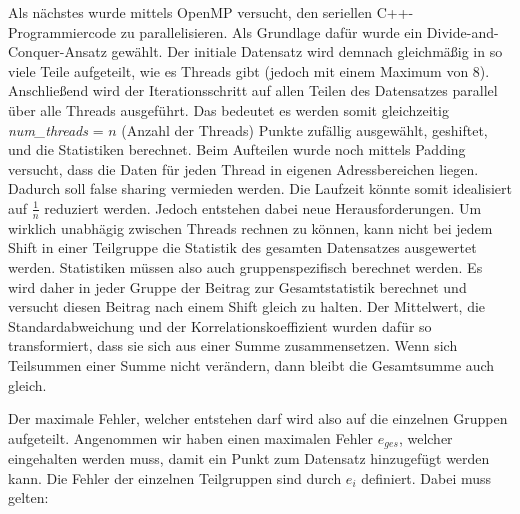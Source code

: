 \documentclass[sigconf]{acmart}
\begin{document}

Als nächstes wurde mittels OpenMP versucht, den seriellen C++-Programmiercode zu parallelisieren. Als Grundlage dafür wurde ein Divide-and-Conquer-Ansatz gewählt. Der initiale Datensatz wird demnach gleichmäßig in so viele Teile aufgeteilt, wie es Threads gibt (jedoch mit einem Maximum von 8). Anschließend wird der Iterationsschritt auf allen Teilen des Datensatzes parallel über alle Threads ausgeführt. Das bedeutet es werden somit gleichzeitig \textit{num\_threads} = $n$ (Anzahl der Threads) Punkte zufällig ausgewählt, geshiftet, und die Statistiken berechnet. Beim Aufteilen wurde noch mittels Padding versucht, dass die Daten für jeden Thread in eigenen Adressbereichen liegen. Dadurch soll false sharing vermieden werden.  
Die Laufzeit könnte somit idealisiert auf $\frac{1}{n}$ reduziert werden.
Jedoch entstehen dabei neue Herausforderungen. Um wirklich unabhägig zwischen Threads rechnen zu können, kann nicht bei jedem Shift in einer Teilgruppe die Statistik des gesamten Datensatzes ausgewertet werden. Statistiken müssen also auch gruppenspezifisch berechnet werden. Es wird daher in jeder Gruppe der Beitrag zur Gesamtstatistik berechnet und versucht diesen Beitrag nach einem Shift gleich zu halten. Der Mittelwert, die Standardabweichung und der Korrelationskoeffizient wurden dafür so transformiert, dass sie sich aus einer Summe zusammensetzen. Wenn sich Teilsummen einer Summe nicht verändern, dann bleibt die Gesamtsumme auch gleich. 
 
Der maximale Fehler, welcher entstehen darf wird also auf die einzelnen Gruppen aufgeteilt. Angenommen wir haben einen maximalen Fehler $e_{ges}$, welcher eingehalten werden muss, damit ein Punkt zum Datensatz hinzugefügt werden kann. Die Fehler der einzelnen Teilgruppen sind durch $e_i$ definiert. Dabei muss gelten:
\end{document}

